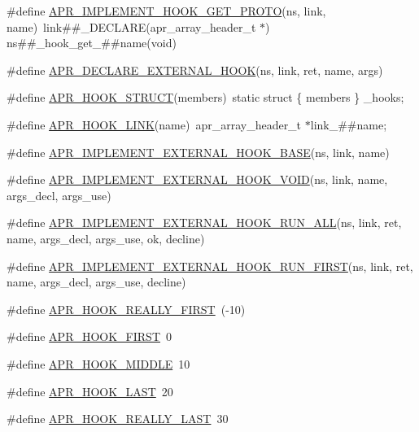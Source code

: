 \begin{DoxyCompactItemize}
\item 
\#define \hyperlink{group___a_p_r___util___hook_ga832a6d3b73a43b3f7c58c5702ddccce9}{A\-P\-R\-\_\-\-I\-M\-P\-L\-E\-M\-E\-N\-T\-\_\-\-H\-O\-O\-K\-\_\-\-G\-E\-T\-\_\-\-P\-R\-O\-T\-O}(ns, link, name)~link\#\#\-\_\-\-D\-E\-C\-L\-A\-R\-E(apr\-\_\-array\-\_\-header\-\_\-t $\ast$) ns\#\#\-\_\-hook\-\_\-get\-\_\-\#\#name(void)
\item 
\#define \hyperlink{group___a_p_r___util___hook_ga69298243d3c4ffb4627fd3d04b522f44}{A\-P\-R\-\_\-\-D\-E\-C\-L\-A\-R\-E\-\_\-\-E\-X\-T\-E\-R\-N\-A\-L\-\_\-\-H\-O\-O\-K}(ns, link, ret, name, args)
\item 
\#define \hyperlink{group___a_p_r___util___hook_gaa936f5a0d1164d301aa157de6023fae5}{A\-P\-R\-\_\-\-H\-O\-O\-K\-\_\-\-S\-T\-R\-U\-C\-T}(members)~static struct \{ members \} \-\_\-hooks;
\item 
\#define \hyperlink{group___a_p_r___util___hook_ga5699f73166bae88b6f6ac0bf7618b0f6}{A\-P\-R\-\_\-\-H\-O\-O\-K\-\_\-\-L\-I\-N\-K}(name)~apr\-\_\-array\-\_\-header\-\_\-t $\ast$link\-\_\-\#\#name;
\item 
\#define \hyperlink{group___a_p_r___util___hook_ga2500abadaa54b3a9d6ec25ff33a6b0cc}{A\-P\-R\-\_\-\-I\-M\-P\-L\-E\-M\-E\-N\-T\-\_\-\-E\-X\-T\-E\-R\-N\-A\-L\-\_\-\-H\-O\-O\-K\-\_\-\-B\-A\-S\-E}(ns, link, name)
\item 
\#define \hyperlink{group___a_p_r___util___hook_ga2d11a43b6431ec568cc1647da4a2079c}{A\-P\-R\-\_\-\-I\-M\-P\-L\-E\-M\-E\-N\-T\-\_\-\-E\-X\-T\-E\-R\-N\-A\-L\-\_\-\-H\-O\-O\-K\-\_\-\-V\-O\-I\-D}(ns, link, name, args\-\_\-decl, args\-\_\-use)
\item 
\#define \hyperlink{group___a_p_r___util___hook_gab466280bdabe0cc2ee5880cbb512fa3d}{A\-P\-R\-\_\-\-I\-M\-P\-L\-E\-M\-E\-N\-T\-\_\-\-E\-X\-T\-E\-R\-N\-A\-L\-\_\-\-H\-O\-O\-K\-\_\-\-R\-U\-N\-\_\-\-A\-L\-L}(ns, link, ret, name, args\-\_\-decl, args\-\_\-use, ok, decline)
\item 
\#define \hyperlink{group___a_p_r___util___hook_ga0420a2aa9ca6b3c1638bdb76025ecc57}{A\-P\-R\-\_\-\-I\-M\-P\-L\-E\-M\-E\-N\-T\-\_\-\-E\-X\-T\-E\-R\-N\-A\-L\-\_\-\-H\-O\-O\-K\-\_\-\-R\-U\-N\-\_\-\-F\-I\-R\-S\-T}(ns, link, ret, name, args\-\_\-decl, args\-\_\-use, decline)
\item 
\#define \hyperlink{group___a_p_r___util___hook_gab004dcbfff32997deb15040e48f07e92}{A\-P\-R\-\_\-\-H\-O\-O\-K\-\_\-\-R\-E\-A\-L\-L\-Y\-\_\-\-F\-I\-R\-S\-T}~(-\/10)
\item 
\#define \hyperlink{group___a_p_r___util___hook_ga564dea4803813674cb6b742f65a3d2b2}{A\-P\-R\-\_\-\-H\-O\-O\-K\-\_\-\-F\-I\-R\-S\-T}~0
\item 
\#define \hyperlink{group___a_p_r___util___hook_gab9a5d50c3478c4d640deccec6b0ce879}{A\-P\-R\-\_\-\-H\-O\-O\-K\-\_\-\-M\-I\-D\-D\-L\-E}~10
\item 
\#define \hyperlink{group___a_p_r___util___hook_gaa610a95f03d7b4aee922c28b0919f028}{A\-P\-R\-\_\-\-H\-O\-O\-K\-\_\-\-L\-A\-S\-T}~20
\item 
\#define \hyperlink{group___a_p_r___util___hook_gae3c7d2cf35e8c89828dfff7a85b0ed77}{A\-P\-R\-\_\-\-H\-O\-O\-K\-\_\-\-R\-E\-A\-L\-L\-Y\-\_\-\-L\-A\-S\-T}~30
\end{DoxyCompactItemize}
